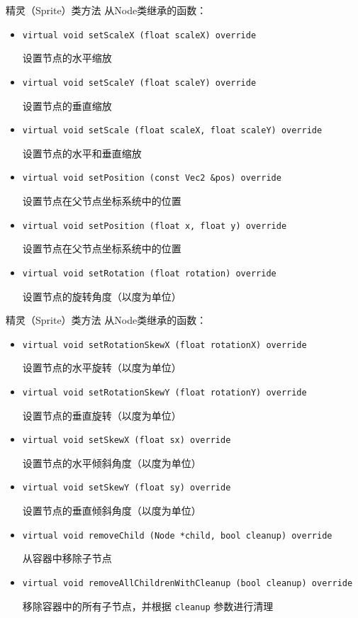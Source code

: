 \documentclass{beamer}
\begin{document}

\begin{frame}[fragile]{精灵（Sprite）类方法}
从Node类继承的函数：
\begin{itemize}
\item \texttt{virtual void setScaleX (float scaleX) override}

设置节点的水平缩放
\item \texttt{virtual void setScaleY (float scaleY) override}

设置节点的垂直缩放
\item \texttt{virtual void setScale (float scaleX, float scaleY) override}

设置节点的水平和垂直缩放
\item \texttt{virtual void setPosition (const Vec2 \&pos) override}

设置节点在父节点坐标系统中的位置
\item \texttt{virtual void setPosition (float x, float y) override}

设置节点在父节点坐标系统中的位置
\item \texttt{virtual void setRotation (float rotation) override}

设置节点的旋转角度（以度为单位）
\end{itemize}
\end{frame}


\begin{frame}[fragile]{精灵（Sprite）类方法}
从Node类继承的函数：
\begin{itemize}
\item \texttt{virtual void setRotationSkewX (float rotationX) override}

设置节点的水平旋转（以度为单位）
\item \texttt{virtual void setRotationSkewY (float rotationY) override}

设置节点的垂直旋转（以度为单位）
\item \texttt{virtual void setSkewX (float sx) override}

设置节点的水平倾斜角度（以度为单位）
\item \texttt{virtual void setSkewY (float sy) override}

设置节点的垂直倾斜角度（以度为单位）
\item \texttt{virtual void removeChild (Node *child, bool cleanup) override}

从容器中移除子节点
\item \texttt{virtual void removeAllChildrenWithCleanup (bool cleanup) override}

移除容器中的所有子节点，并根据 \texttt{cleanup} 参数进行清理
\end{itemize}
\end{frame}
\end{document}

